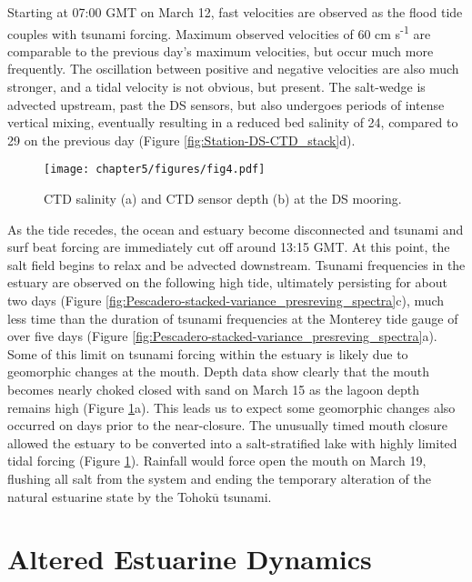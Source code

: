 Starting at 07:00 GMT on March 12, fast velocities are observed as
the flood tide couples with tsunami forcing. Maximum observed velocities
of 60 cm s\textsuperscript{-1} are comparable to the previous day's
maximum velocities, but occur much more frequently. The oscillation
between positive and negative velocities are also much stronger, and
a tidal velocity is not obvious, but present. The salt-wedge is advected
upstream, past the DS sensors, but also undergoes periods of intense
vertical mixing, eventually resulting in a reduced bed salinity of
24, compared to 29 on the previous day (Figure \ref{fig:Station-DS-CTD_stack}d). 



\begin{figure}
\texttt{[image: chapter5/figures/fig4.pdf]}

\protect\caption{CTD salinity (a) and CTD sensor depth (b) at the DS mooring. \label{fig:ctd_longer_record}}
\end{figure}

As the tide recedes, the ocean and estuary become disconnected and
tsunami and surf beat forcing are immediately cut off around 13:15
GMT. At this point, the salt field begins to relax and be advected
downstream. Tsunami frequencies in the estuary are observed on the
following high tide, ultimately persisting for about two days (Figure
\ref{fig:Pescadero-stacked-variance_presreving_spectra}c), much less
time than the duration of tsunami frequencies at the Monterey tide
gauge of over five days (Figure \ref{fig:Pescadero-stacked-variance_presreving_spectra}a).
Some of this limit on tsunami forcing within the estuary is likely
due to geomorphic changes at the mouth. Depth data show clearly that
the mouth becomes nearly choked closed with sand on March 15 as the
lagoon depth remains high (Figure \ref{fig:ctd_longer_record}a).
This leads us to expect some geomorphic changes also occurred on days
prior to the near-closure. The unusually timed mouth closure allowed
the estuary to be converted into a salt-stratified lake with highly
limited tidal forcing (Figure \ref{fig:ctd_longer_record}). Rainfall
would force open the mouth on March 19, flushing all salt from the
system and ending the temporary alteration of the natural estuarine
state by the Tohok$\overline{\mathrm{u}}$ tsunami. 


\section{Altered Estuarine Dynamics}

